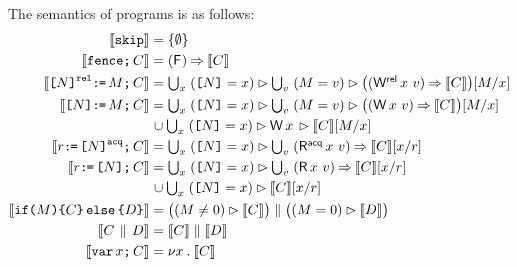 The semantics of programs is as follows:
\allowdisplaybreaks
\begin{align*}
  \sem{\SKIP} & = \{ \emptyset \} \\
  \sem{\FENCE\SEMI \aCmd} & = (\DF{}) \prefix \sem{\aCmd} \\
  \sem{\REFRel{\bExp}\GETS\aExp\SEMI \aCmd} & = \textstyle\bigcup_\aLoc\; (\REF{\bExp}=\aLoc) \guard \textstyle\bigcup_\aVal\;  (\aExp=\aVal) \guard\bigl((\DWRel\aLoc\aVal) \prefix \sem{\aCmd}\bigr)[\aExp/\aLoc] \\
  \sem{\REF{\bExp}\GETS\aExp\SEMI \aCmd} & = \textstyle\bigcup_\aLoc\; (\REF{\bExp}=\aLoc) \guard \textstyle\bigcup_\aVal\;  (\aExp=\aVal) \guard\bigl((\DW\aLoc\aVal) \prefix \sem{\aCmd}\bigr)[\aExp/\aLoc]\\
  & \mkern2mu\cup \textstyle\bigcup_\aLoc\; (\REF{\bExp}=\aLoc) \guard \DW{\aLoc}{} \guard \sem{\aCmd}[\aExp/\aLoc]\\
  \sem{\aReg\GETS\REFAcq{\bExp}\SEMI \aCmd} & = \textstyle\bigcup_\aLoc\; (\REF{\bExp}=\aLoc) \guard \textstyle\bigcup_\aVal\; (\DRAcq\aLoc\aVal) \prefix \sem{\aCmd}[\aLoc/\aReg] \\
  \sem{\aReg\GETS\REF{\bExp}\SEMI \aCmd} & = \textstyle\bigcup_\aLoc\; (\REF{\bExp}=\aLoc) \guard \textstyle\bigcup_\aVal\; (\DR\aLoc\aVal) \prefix \sem{\aCmd}[\aLoc/\aReg] \\
  & \mkern2mu\cup \textstyle\bigcup_\aLoc\; (\REF{\bExp}=\aLoc) \guard \sem{\aCmd}[\aLoc/\aReg]\\
  \sem{\IF{\aExp} \THEN \aCmd \ELSE \bCmd \FI} & =  \bigl((\aExp \neq 0) \guard \sem{\aCmd}\bigr) \parallel \bigl((\aExp=0) \guard \sem{\bCmd}\bigr) \\
  \sem{\aCmd \PAR \bCmd} & =  \sem{\aCmd} \parallel \sem{\bCmd} \\
  \sem{\VAR\aLoc\SEMI \aCmd} & =  \nu \aLoc \st \sem{\aCmd}
\end{align*}

